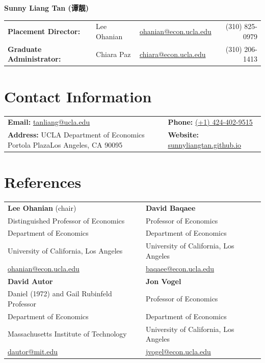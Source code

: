 \documentclass[11pt,letterpaper]{article}
\begin{document}
\fontsize{10.5}{11.85}\selectfont
\titlespacing*{\section}{0pt}{6pt}{4pt}
\begin{center}{\LARGE\bfseries Sunny Liang Tan {\chinesefont (谭靓)}}\end{center}
\begin{tabularx}{\linewidth}{@{}l l X r@{}}
\textbf{Placement Director:}&Lee Ohanian&\href{mailto:ohanian@econ.ucla.edu}{ohanian@econ.ucla.edu}&(310) 825-0979\\[2pt]
\textbf{Graduate Administrator:}&Chiara Paz&\href{mailto:chiara@econ.ucla.edu}{chiara@econ.ucla.edu}&(310) 206-1413
\end{tabularx}
\section*{Contact Information}
\begin{tabularx}{\linewidth}{@{}X X@{}}
\textbf{Email:} \href{mailto:tanliang@ucla.edu}{tanliang@ucla.edu}&\textbf{Phone:} \href{tel:+14244029515}{(+1) 424-402-9515}\\[4pt]
\textbf{Address:} UCLA Department of Economics\newline 315 Portola Plaza\newline Los Angeles, CA 90095&\textbf{Website:} \href{https://sunnyliangtan.github.io}{sunnyliangtan.github.io}
\end{tabularx}
\section*{References}
\begin{tabularx}{\linewidth}{@{}X X@{}}
\textbf{Lee Ohanian} (chair)&\textbf{David Baqaee}\\
Distinguished Professor of Economics&Professor of Economics\\
Department of Economics&Department of Economics\\
University of California, Los Angeles&University of California, Los Angeles\\
\href{mailto:ohanian@econ.ucla.edu}{ohanian@econ.ucla.edu}&\href{mailto:baqaee@econ.ucla.edu}{baqaee@econ.ucla.edu}\\[9pt]
\textbf{David Autor}&\textbf{Jon Vogel}\\
Daniel (1972) and Gail Rubinfeld Professor&Professor of Economics\\
Department of Economics&Department of Economics\\
Massachusetts Institute of Technology&University of California, Los Angeles\\
\href{mailto:dautor@mit.edu}{dautor@mit.edu}&\href{mailto:jvogel@econ.ucla.edu}{jvogel@econ.ucla.edu}
\end{tabularx}
\end{document}
